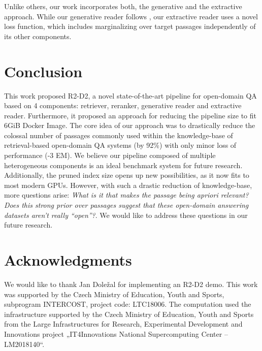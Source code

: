 \documentclass[11pt,a4paper]{article}
\begin{document}
\begin{description}[style=unboxed,leftmargin=0em,listparindent=\parindent,parsep=0pt,]
Unlike others, our work incorporates both, the generative and the extractive approach. While our generative reader follows \citet{izacard2020leveraging}, our extractive reader uses a novel loss function, which includes marginalizing over target passages independently of its other components.


\end{description}

\section{Conclusion}
This work proposed R2-D2, a novel state-of-the-art pipeline for open-domain QA based on 4 components: retriever, reranker, generative reader and extractive reader. Furthermore, it proposed an approach for reducing the pipeline size to fit 6GiB Docker Image. The core idea of our approach was to drastically reduce the colossal number of passages commonly used within the knowledge-base of retrieval-based open-domain QA systems (by 92\%) with only minor loss of performance (-3 EM).
We believe our pipeline composed of multiple heterogeneous components is an ideal benchmark system for future research. Additionally, the pruned index size opens up new possibilities, as it now fits to most modern GPUs. 
However, with such a drastic reduction of knowledge-base, more questions arise: \textit{What is it that makes the passage being apriori relevant? Does this strong prior over passages suggest that these  open-domain answering datasets aren't really ``open''?}. We would like to address these questions in our future research.

\section*{Acknowledgments}
We would like to thank Jan Doležal for implementing an R2-D2 demo.
This work was supported by the Czech Ministry of Education, Youth and Sports, subprogram INTERCOST, project code: LTC18006.
The computation used the infrastructure supported by the Czech Ministry of Education, Youth and Sports from the Large Infrastructures for Research, Experimental Development and Innovations project „IT4Innovations National Supercomputing Center – LM2018140“.





\appendix
\clearpage
\end{document}
